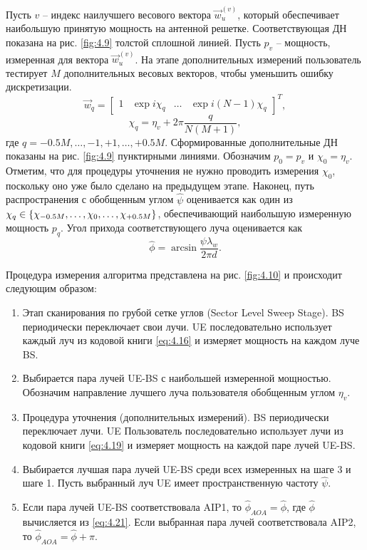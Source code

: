 Пусть $v$ -- индекс наилучшего весового вектора $\vec w_u^{(v)}$, который
обеспечивает наибольшую принятую мощность на антенной решетке.  Соответствующая
ДН показана на рис. \ref{fig:4.9} толстой сплошной линией. Пусть $p_v$ --
мощность, измеренная для вектора $\vec w_u^{(v)}$. На этапе дополнительных измерений
пользователь тестирует $M$ дополнительных весовых векторов, чтобы уменьшить
ошибку дискретизации.
\begin{equation}
    \label{eq:4.19}
    \vec w_q =
    \begin{bmatrix}
        1 & \exp {i \chi_q} & \dots & \exp{i(N-1)\chi_q}
    \end{bmatrix}^T,
\end{equation}
\begin{equation}
    \label{eq:4.20}
    \chi_q = \eta_v + 2\pi \frac{q}{N(M+1)},
\end{equation}
где $q=-0.5M,\dots,-1,+1,\dots,+0.5M$. Сформированные дополнительные ДН показаны
на рис. \ref{fig:4.9} пунктирными линиями.  Обозначим $p_0= p_v$ и $\chi_0 =
\eta_v$. Отметим, что для процедуры уточнения не нужно проводить измерения
$\chi_0$, поскольку оно уже было сделано на предыдущем этапе.  Наконец, путь
распространения с обобщенным углом $\hat \psi$ оценивается как один из $\chi_q
\in \qty{\chi_{-0.5 M}, \dots, \chi_0, \dots, \chi_{+0.5M}}$, обеспечивающий
наибольшую измеренную мощность $p_q$. Угол прихода соответствующего луча
оценивается как
\begin{equation}
    \label{eq:4.21}
    \hat \phi = \arcsin{\frac{\psi \lambda_w}{2\pi d}}.
\end{equation}

Процедура измерения алгоритма представлена на рис. \ref{fig:4.10} и происходит следующим образом:

\begin{enumerate}[label=\textbf{Шаг \arabic*:}]
    \item Этап сканирования по грубой сетке углов (Sector Level Sweep Stage). 
          BS периодически переключает свои лучи. 
          UE последовательно использует каждый луч из кодовой книги \eqref{eq:4.16} 
          и измеряет мощность на каждом луче BS.
    \item Выбирается пара лучей UE-BS с наибольшей измеренной мощностью.
          Обозначим направление лучшего луча пользователя обобщенным углом $\eta_v$.
    \item Процедура уточнения (дополнительных измерений). BS периодически переключает лучи. UE
          Пользователь последовательно использует лучи из кодовой книги \eqref{eq:4.19} 
          и измеряет мощность на каждой паре лучей UE-BS.
    \item Выбирается лучшая пара лучей UE-BS среди всех измеренных на шаге 3 и шаге 1. 
    Пусть выбранный луч UE имеет пространственную частоту $\hat \psi$.
    \item Если пара лучей UE-BS соответствовала AIP1, то $\hat \phi_{AOA} = \hat \phi$, где 
    $\hat \phi$ вычисляется из \eqref{eq:4.21}.
    Если выбранная пара лучей соответствовала AIP2, то $\hat \phi_{AOA} = \hat \phi + \pi$. 
\end{enumerate}

